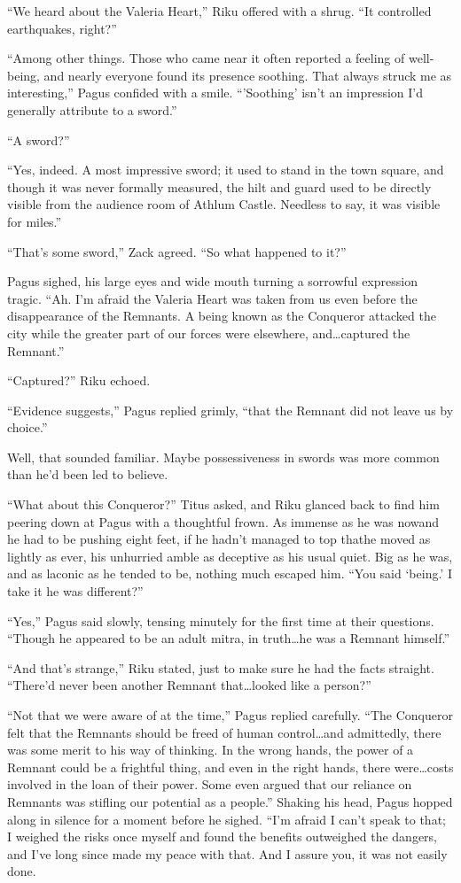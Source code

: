 ``We heard about the Valeria Heart,'' Riku offered with a shrug. ``It controlled earthquakes, right?''

``Among other things. Those who came near it often reported a feeling of well-being, and nearly everyone found its presence soothing. That always struck me as interesting,'' Pagus confided with a smile. ``'Soothing' isn't an impression I'd generally attribute to a sword.''

``A sword?''

``Yes, indeed. A most impressive sword; it used to stand in the town square, and though it was never formally measured, the hilt and guard used to be directly visible from the audience room of Athlum Castle. Needless to say, it was visible for miles.''

``That's some sword,'' Zack agreed. ``So what happened to it?''

Pagus sighed, his large eyes and wide mouth turning a sorrowful expression tragic. ``Ah. I'm afraid the Valeria Heart was taken from us even before the disappearance of the Remnants. A being known as the Conqueror attacked the city while the greater part of our forces were elsewhere, and\ldots captured the Remnant.''

``Captured?'' Riku echoed.

``Evidence suggests,'' Pagus replied grimly, ``that the Remnant did not leave us by choice.''

Well, that sounded familiar. Maybe possessiveness in swords was more common than he'd been led to believe.

``What about this Conqueror?'' Titus asked, and Riku glanced back to find him peering down at Pagus with a thoughtful frown. As immense as he was now\textemdash and he had to be pushing eight feet, if he hadn't managed to top that\textemdash he moved as lightly as ever, his unhurried amble as deceptive as his usual quiet. Big as he was, and as laconic as he tended to be, nothing much escaped him. ``You said `being.' I take it he was different?''

``Yes,'' Pagus said slowly, tensing minutely for the first time at their questions. ``Though he appeared to be an adult mitra, in truth\ldots he was a Remnant himself.''

``And that's strange,'' Riku stated, just to make sure he had the facts straight. ``There'd never been another Remnant that\ldots looked like a person?''

``Not that we were aware of at the time,'' Pagus replied carefully. ``The Conqueror felt that the Remnants should be freed of human control\ldots and admittedly, there was some merit to his way of thinking. In the wrong hands, the power of a Remnant could be a frightful thing, and even in the right hands, there were\ldots costs involved in the loan of their power. Some even argued that our reliance on Remnants was stifling our potential as a people.'' Shaking his head, Pagus hopped along in silence for a moment before he sighed. ``I'm afraid I can't speak to that; I weighed the risks once myself and found the benefits outweighed the dangers, and I've long since made my peace with that. And I assure you, it was not easily done.

